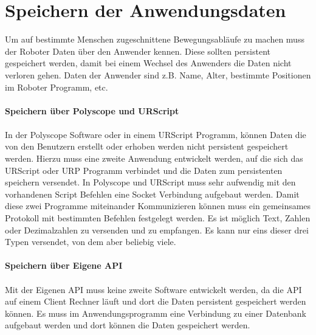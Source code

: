 \section{Speichern der Anwendungsdaten}
\label{sec:save_of_data_kon}

Um auf bestimmte Menschen zugeschnittene Bewegungsabläufe zu machen muss der Roboter Daten über den Anwender kennen. Diese sollten persistent gespeichert werden, damit bei einem Wechsel des Anwenders die Daten nicht verloren gehen.
Daten der Anwender sind z.B. Name, Alter, bestimmte Positionen im Roboter Programm, etc.
\\\\
\textbf{Speichern über Polyscope und URScript}
\label{sec:save_data_polyscope_kon}
\\\\
In der Polyscope Software oder in einem URScript Programm, können Daten die von den Benutzern erstellt oder erhoben werden nicht persistent
gespeichert werden. Hierzu muss eine zweite Anwendung entwickelt werden, auf die sich das URScript oder \ac{URP} Programm verbindet und die Daten zum persistenten speichern versendet.
In Polyscope und URScript muss sehr aufwendig mit den vorhandenen Script Befehlen eine Socket Verbindung aufgebaut werden.
Damit diese zwei Programme miteinander Kommunizieren können muss ein gemeinsames Protokoll mit bestimmten Befehlen festgelegt werden. Es ist möglich Text, Zahlen oder Dezimalzahlen zu versenden und zu empfangen. Es kann nur eins dieser drei Typen versendet, von dem aber beliebig viele. 
\\\\
\textbf{Speichern über Eigene API}
\label{save_data_own_api_kon}
\\\\
Mit der Eigenen \ac{API} muss keine zweite Software entwickelt werden, da die \ac{API} auf einem Client Rechner läuft und dort die Daten persistent gespeichert werden können. Es muss im Anwendungsprogramm eine Verbindung zu einer Datenbank aufgebaut werden und dort können die Daten gespeichert werden.